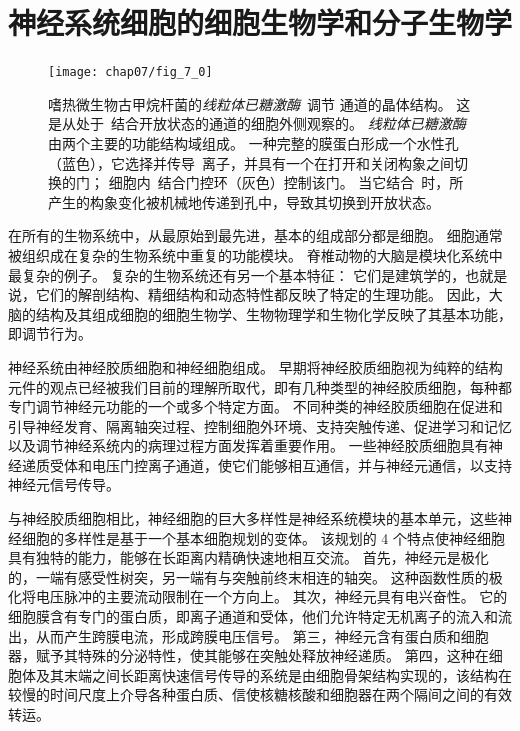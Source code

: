 \part{神经系统细胞的细胞生物学和分子生物学}

\begin{figure}[htbp]
	\centering
	\texttt{[image: chap07/fig\_7\_0]}
	\caption{嗜热微生物古甲烷杆菌的\textit{线粒体已糖激酶}~调节 通道的晶体结构。
		这是从处于~结合开放状态的通道的细胞外侧观察的。
		\textit{线粒体已糖激酶}由两个主要的功能结构域组成。
		一种完整的膜蛋白形成一个水性孔（蓝色），它选择并传导~离子，并具有一个在打开和关闭构象之间切换的门；
		细胞内~结合门控环（灰色）控制该门。
		当它结合~时，所产生的构象变化被机械地传递到孔中，导致其切换到开放状态。}
	\label{fig:7_0}
\end{figure}





在所有的生物系统中，从最原始到最先进，基本的组成部分都是细胞。
细胞通常被组织成在复杂的生物系统中重复的功能模块。
脊椎动物的大脑是模块化系统中最复杂的例子。
复杂的生物系统还有另一个基本特征：
它们是建筑学的，也就是说，它们的解剖结构、精细结构和动态特性都反映了特定的生理功能。
因此，大脑的结构及其组成细胞的细胞生物学、生物物理学和生物化学反映了其基本功能，即调节行为。


神经系统由神经胶质细胞和神经细胞组成。
早期将神经胶质细胞视为纯粹的结构元件的观点已经被我们目前的理解所取代，即有几种类型的神经胶质细胞，每种都专门调节神经元功能的一个或多个特定方面。
不同种类的神经胶质细胞在促进和引导神经发育、隔离轴突过程、控制细胞外环境、支持突触传递、促进学习和记忆以及调节神经系统内的病理过程方面发挥着重要作用。
一些神经胶质细胞具有神经递质受体和电压门控离子通道，使它们能够相互通信，并与神经元通信，以支持神经元信号传导。


与神经胶质细胞相比，神经细胞的巨大多样性是神经系统模块的基本单元，这些神经细胞的多样性是基于一个基本细胞规划的变体。
该规划的 4 个特点使神经细胞具有独特的能力，能够在长距离内精确快速地相互交流。
首先，神经元是极化的，一端有感受性树突，另一端有与突触前终末相连的轴突。
这种函数性质的极化将电压脉冲的主要流动限制在一个方向上。
其次，神经元具有电兴奋性。
它的细胞膜含有专门的蛋白质，即离子通道和受体，他们允许特定无机离子的流入和流出，从而产生跨膜电流，形成跨膜电压信号。
第三，神经元含有蛋白质和细胞器，赋予其特殊的分泌特性，使其能够在突触处释放神经递质。
第四，这种在细胞体及其末端之间长距离快速信号传导的系统是由细胞骨架结构实现的，该结构在较慢的时间尺度上介导各种蛋白质、信使核糖核酸和细胞器在两个隔间之间的有效转运。


